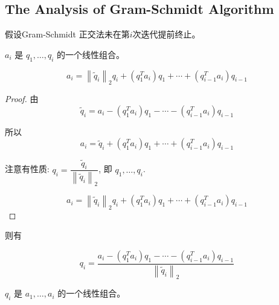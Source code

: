 \subsection{The Analysis of Gram-Schmidt Algorithm}

假设Gram-Schmidt 正交法未在第$i$次迭代提前终止。

\begin{corollary}
    $ a_{i} $ 是 $ q_{1}, \ldots, q_{i} $ 的一个线性组合。
    
    \begin{equation} a_{i}=\left\|\tilde{q}_{i}\right\|_{2} q_{i}+\left(q_{1}^{T} a_{i}\right) q_{1}+\cdots+\left(q_{i-1}^{T} a_{i}\right) q_{i-1} \end{equation}
\end{corollary}

\begin{proof}
    由
    \begin{equation} \tilde{q}_{i}=a_{i}-\left(q_{1}^{T} a_{i}\right) q_{1}-\cdots-\left(q_{i-1}^{T} a_{i}\right) q_{i-1} \end{equation}

    所以
    \begin{equation}a_{i}= \tilde{q}_{i}+\left(q_{1}^{T} a_{i}\right) q_{1}+\cdots+\left(q_{i-1}^{T} a_{i}\right) q_{i-1} \end{equation}

    注意有性质: $
    q_{i}=\dfrac{\tilde{q}_{i}}{\left\|\tilde{q}_{i}\right\|_{2}}$, 即 $ q_{1}, \ldots, q_{i} $.

    \begin{equation} a_{i}=\left\|\tilde{q}_{i}\right\|_{2} q_{i}+\left(q_{1}^{T} a_{i}\right) q_{1}+\cdots+\left(q_{i-1}^{T} a_{i}\right) q_{i-1} \end{equation}
\end{proof}


则有 

\begin{corollary}
    \begin{equation}q_{i} = \frac{a_{i}-\left(q_{1}^{T} a_{i}\right) q_{1}-\cdots-\left(q_{i-1}^{T} a_{i}\right) q_{i-1}}{\left\|\tilde{q}_{i}\right\|_{2}}\end{equation}
\end{corollary}


\begin{corollary}
    $ q_{i} $ 是 $ a_{1}, \ldots, a_{i} $ 的一个线性组合。
\end{corollary}

